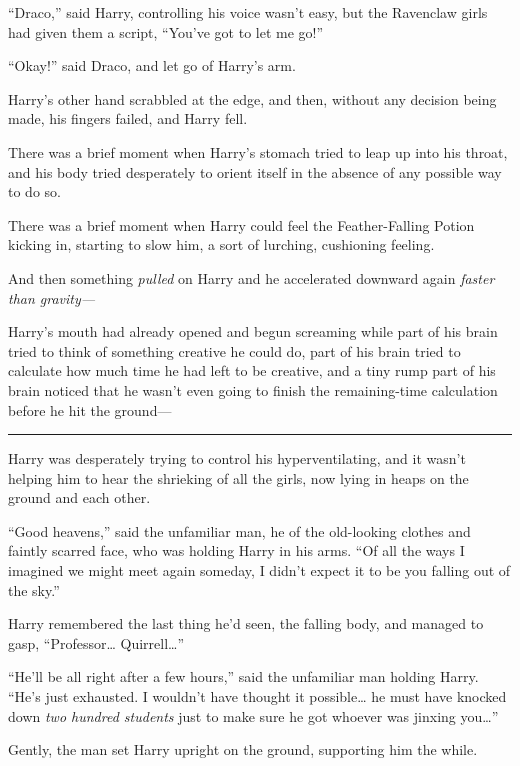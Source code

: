 ``Draco,'' said Harry, controlling his voice wasn't easy, but the
Ravenclaw girls had given them a script, ``You've got to let me go!''

``Okay!'' said Draco, and let go of Harry's arm.

Harry's other hand scrabbled at the edge, and then, without any decision
being made, his fingers failed, and Harry fell.

There was a brief moment when Harry's stomach tried to leap up into his
throat, and his body tried desperately to orient itself in the absence
of any possible way to do so.

There was a brief moment when Harry could feel the Feather-Falling
Potion kicking in, starting to slow him, a sort of lurching, cushioning
feeling.

And then something \emph{pulled} on Harry and he accelerated downward
again \emph{faster than gravity---}

Harry's mouth had already opened and begun screaming while part of his
brain tried to think of something creative he could do, part of his
brain tried to calculate how much time he had left to be creative, and a
tiny rump part of his brain noticed that he wasn't even going to finish
the remaining-time calculation before he hit the ground---

\begin{center}\rule{3in}{0.4pt}\end{center}

Harry was desperately trying to control his hyperventilating, and it
wasn't helping him to hear the shrieking of all the girls, now lying in
heaps on the ground and each other.

``Good heavens,'' said the unfamiliar man, he of the old-looking clothes
and faintly scarred face, who was holding Harry in his arms. ``Of all
the ways I imagined we might meet again someday, I didn't expect it to
be you falling out of the sky.''

Harry remembered the last thing he'd seen, the falling body, and managed
to gasp, ``Professor\ldots{} Quirrell\ldots{}''

``He'll be all right after a few hours,'' said the unfamiliar man
holding Harry. ``He's just exhausted. I wouldn't have thought it
possible\ldots{} he must have knocked down \emph{two hundred students}
just to make sure he got whoever was jinxing you\ldots{}''

Gently, the man set Harry upright on the ground, supporting him the
while.

